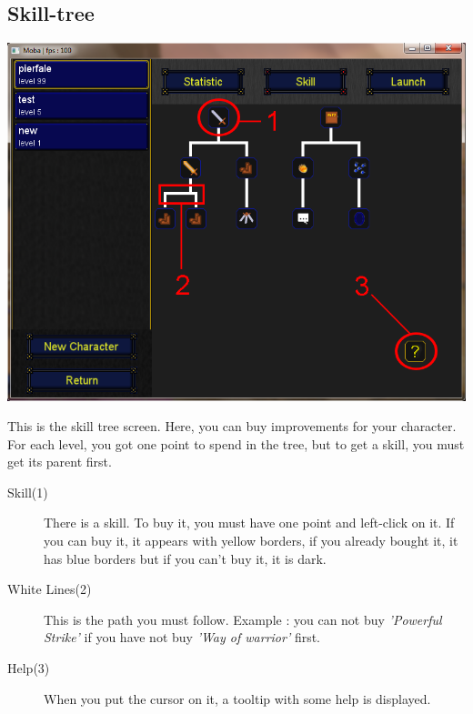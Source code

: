 \documentclass{scrreprt}
\begin{document}
		  \subsection{Skill-tree}
		  \begin{center}
		  \includegraphics[scale=0.4]{skill_tree_screen.png}
		  \end{center}
		  This is the skill tree screen. Here, you can buy improvements for your character. For each level, you got one point to spend in the tree, but to get a skill, you must get its parent first.
		  \begin{description}
		  \item[Skill(1)]{There is a skill. To buy it, you must have one point and left-click on it. If you can buy it, it appears with yellow borders, if you already bought it, it has blue borders but if you can't buy it, it is dark.}
		  \item[White Lines(2)]{This is the path you must follow. Example : you can not buy \emph{'Powerful Strike'} if you have not buy \emph{'Way of warrior'} first.}
		  \item[Help(3)]{When you put the cursor on it, a tooltip with some help is displayed.}
		  \end{description}
\end{document}
